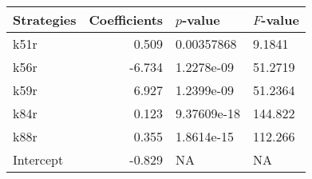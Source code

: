 \begin{tabular}{lrll}
\toprule
Strategies &  Coefficients &    $p$-value & $F$-value \\
\midrule
      k51r &         0.509 &   0.00357868 &    9.1841 \\
      k56r &        -6.734 &   1.2278e-09 &   51.2719 \\
      k59r &         6.927 &   1.2399e-09 &   51.2364 \\
      k84r &         0.123 &  9.37609e-18 &   144.822 \\
      k88r &         0.355 &   1.8614e-15 &   112.266 \\
 Intercept &        -0.829 &           NA &        NA \\
\bottomrule
\end{tabular}
